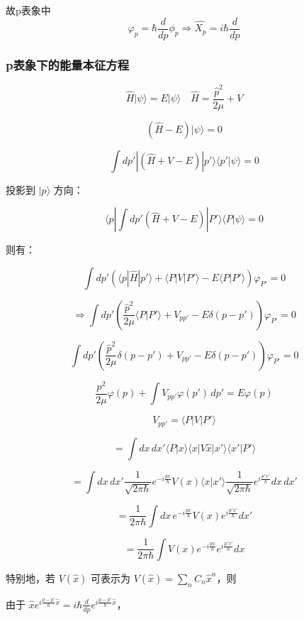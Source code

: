 \documentclass[lang=cn,15pt]{elegantbook}
\begin{document}
故p表象中
\begin{equation*}
	\varphi_p=\hbar\frac{d}{dp}\phi_p\Rightarrow \hat{X_p}=i\hbar\frac{d}{dp}
\end{equation*}

\subsubsection{p表象下的能量本征方程}

\[
\hat{H} | \psi \rangle = E | \psi \rangle \quad \hat{H} = \frac{\hat{p}^2}{2\mu} + V
\]

\[
(\hat{H} - E) | \psi \rangle = 0
\]

\[
\int dp'  | (\hat{H} + V - E) | p' \rangle \langle p' | \psi \rangle = 0
\]

投影到 $| p \rangle$ 方向：

\[
\langle p | \int dp' (\hat{H} + V - E) | P' \rangle \langle P | \psi \rangle = 0
\]

则有：

\[
\int dp' \left( \langle p | \hat{H} | p' \rangle + \langle P | V | P' \rangle - E \langle P | P' \rangle \right) \varphi_{P'} = 0
\]

\[
\Rightarrow \int dp' \left( \frac{\hat{p}^2}{2\mu} \langle P | P' \rangle + V_{pp'} - E \delta(p - p') \right) \varphi_{P'} = 0
\]

\[
\int dp' \left( \frac{\hat{p}^2}{2\mu} \delta(p - p') + V_{pp'} - E \delta(p - p') \right) \varphi_{P'} = 0
\]

\[
\frac{p^2}{2\mu}\varphi(p)  + \int V_{pp'} \varphi(p') \, dp' = E \varphi(p)
\]


\[
V_{pp'} = \langle P | V | P' \rangle
\]

\[
= \int dx \, dx' \langle P | x \rangle \langle x | V \hat{x} | x' \rangle \langle x' | P' \rangle
\]

\[
= \int dx \, dx' \frac{1}{\sqrt{2\pi \hbar}} e^{-i \frac{p x}{\hbar}} V(x) \langle x | x' \rangle \frac{1}{\sqrt{2\pi \hbar}} e^{i \frac{p' x'}{\hbar}} dx \, dx'
\]

\[
= \frac{1}{2\pi \hbar} \int dx \, e^{-i \frac{p x}{\hbar}} V(x)  e^{i \frac{p' x'}{\hbar}} dx'
\]

\[
= \frac{1}{2\pi \hbar} \int V(x) e^{-i \frac{p x}{\hbar}} e^{i \frac{p' x'}{\hbar}} dx
\]

特别地，若 $V(\hat{x})$ 可表示为 $V(\hat{x}) = \sum_n C_n \hat{x}^n$，则

由于 $\hat{x} e^{i \frac{p-p'}{\hbar} \hat{x}} = i \hbar \frac{d}{dp} e^{i \frac{p-p'}{\hbar} \hat{x}}$，
\end{document}
